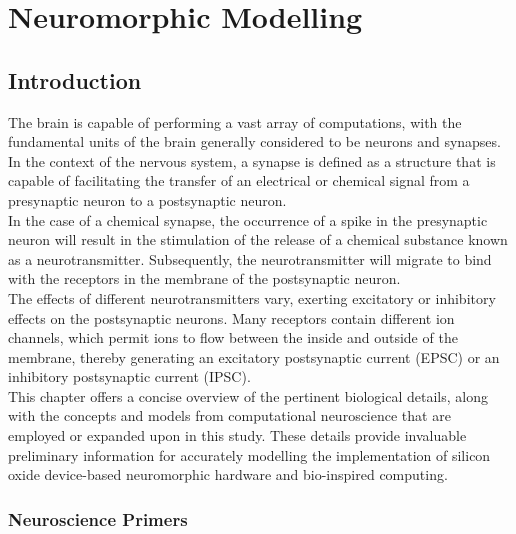 \chapter{Neuromorphic Modelling}

\section[Introduction]{Introduction}

The brain is capable of performing a vast array of computations, with the fundamental units of the brain generally considered to be neurons and synapses. In the context of the nervous system, a synapse is defined as a structure that is capable of facilitating the transfer of an electrical or chemical signal from a presynaptic neuron to a postsynaptic neuron. \\

\noindent In the case of a chemical synapse, the occurrence of a spike in the presynaptic neuron will result in the stimulation of the release of a chemical substance known as a neurotransmitter. Subsequently, the neurotransmitter will migrate to bind with the receptors in the membrane of the postsynaptic neuron. \\

\noindent The effects of different neurotransmitters vary, exerting excitatory or inhibitory effects on the postsynaptic neurons. Many receptors contain different ion channels, which permit ions to flow between the inside and outside of the membrane, thereby generating an excitatory postsynaptic current (EPSC) or an inhibitory postsynaptic current (IPSC). \\

\noindent This chapter offers a concise overview of the pertinent biological details, along with the concepts and models from computational neuroscience that are employed or expanded upon in this study. These details provide invaluable preliminary information for accurately modelling the implementation of silicon oxide device-based neuromorphic hardware and bio-inspired computing.

\subsection[Neuroscience Primers]{Neuroscience Primers}

